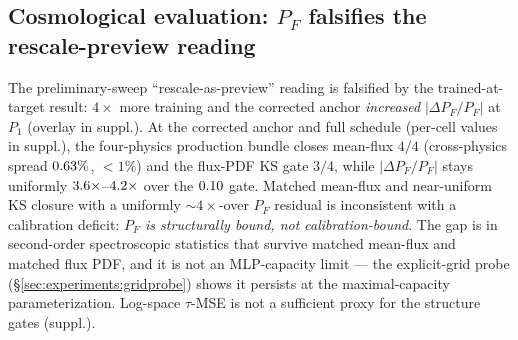\begin{table}[t]
    \caption{\textbf{Main structure-gate readout: 4 Sherwood feedback variants ($P_1$--$P_4$) $\times$ 3 primary gates.} Configuration: full publication run, $50{,}000$ steps, $n_{\text{rays}}=64$, seed $=0$, $\langle F\rangle_{\text{obs}}=\AnchorMeanF$~\cite{kirkman2007}. KS and $\langle F_{\rm pred}\rangle$ are reported with 5-seed sightline-level bootstrap ($K=\BootstrapK$ resamples, prediction and truth-side seeds from independent PCG64 streams; anti-degeneracy F1/F2 audit PASS, suppl.); $P_F$ residual reported at the seed=42 single-seed anchor. \textbf{Verdict: mean-flux 2/4 CIs overlap the Kirkman+2007 anchor at q84 ($P_3$/$P_4$ marginal); KS 3/4 PASS bootstrap-robustly ($P_2$ q84 $=\KSBootstrapQHiPtwo$ fails $1.5\times$); $P_F$ 0/4 PASS, uniformly $\PFfactorOverGateLo\times$--$\PFfactorOverGateHi\times$ over the $\GatePF$ bar.} $^\dagger$The 1D-along-ray density-correlation proxy $r_\rho^{\log}$ is a \emph{necessary-but-not-sufficient surrogate} for the full 3D $\xi_{\hat\rho,\rho}(r=2\,h^{-1}\,\text{Mpc})>\GateXi$ gate; the value shown is the preliminary-sweep T3 checkpoint at $P_1$ (anchor-invariant); production-run re-evaluation owed and sequenced behind \S\ref{sec:nextsteps}.}
    \label{tab:headline-3gate}
\end{table}

\subsection{\texorpdfstring{Cosmological evaluation: $P_F$ falsifies the rescale-preview reading}{Cosmological evaluation: PF falsifies the rescale-preview reading}}
\label{sec:experiments:cosmological-eval}
The preliminary-sweep ``rescale-as-preview'' reading is falsified by the trained-at-target result: $4\times$ more training and the corrected anchor \emph{increased} $|\Delta P_F/P_F|$ at $P_1$ (overlay in suppl.). At the corrected anchor and full schedule (per-cell values in suppl.), the four-physics production bundle closes mean-flux $4/4$ (cross-physics spread $0.63\%$, $<\!1\%$) and the flux-PDF KS gate $3/4$, while $|\Delta P_F/P_F|$ stays uniformly $\PFfactorOverGateLo\times$--$\PFfactorOverGateHi\times$ over the $0.10$ gate. Matched mean-flux and near-uniform KS closure with a uniformly $\sim\!4\times$-over $P_F$ residual is inconsistent with a calibration deficit: \emph{$P_F$ is structurally bound, not calibration-bound}. The gap is in second-order spectroscopic statistics that survive matched mean-flux and matched flux PDF, and it is not an MLP-capacity limit --- the explicit-grid probe (\S\ref{sec:experiments:gridprobe}) shows it persists at the maximal-capacity parameterization. Log-space $\tau$-MSE is not a sufficient proxy for the structure gates (suppl.).

